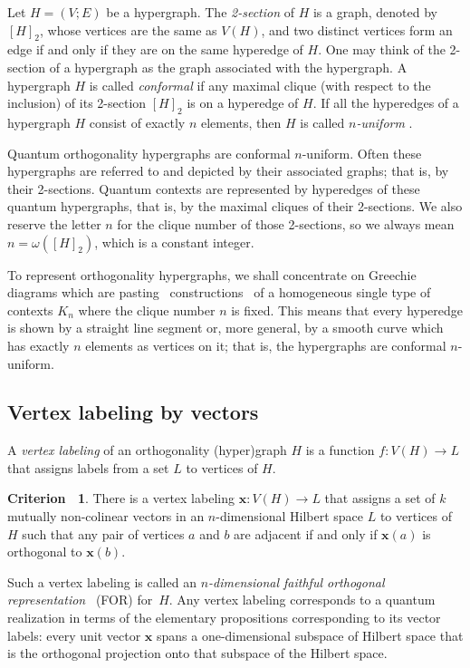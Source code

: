 \documentclass[%
12pt,
prereprint,
showpacs,
showkeys,
preprintnumbers,
amsmath,amssymb,
aps,
pra,
longbibliography,
notitlepage
]{revtex4-1}
\theoremstyle{definition}
\newtheorem{criterion}[theorem]{{\color{THM}Criterion\ }}
\begin{document}
	Let $H = (V;E)$ be a hypergraph. The \emph{2-section}  of $H$ is a graph, denoted by $[H]_2$, whose vertices are the same as $V(H)$, and two distinct vertices form an edge if and only if they are on the same hyperedge of $H$. One may think of the 2-section of a hypergraph as the graph associated with the hypergraph. A hypergraph $H$ is called \emph{conformal} if any maximal clique (with respect to the inclusion) of its 2-section $[H]_2$ is on a hyperedge of $H$. If all the hyperedges of a hypergraph $H$ consist of exactly $n$ elements, then $H$ is called \emph{$n$-uniform} \cite{Bretto-MR3077516}.
	
	
	
	Quantum orthogonality hypergraphs are conformal $n$-uniform. Often these hypergraphs are referred to and depicted by their associated graphs; that is, by their 2-sections. Quantum contexts are represented by hyperedges of these quantum hypergraphs, that is, by the maximal cliques of their 2-sections. We also reserve the letter $n$ for the clique number of those 2-sections, so we always mean $n=\omega ([H]_2 )$, which is a constant integer.
	
	To represent orthogonality hypergraphs, we shall concentrate on Greechie diagrams which are pasting~\cite{Greechie1968} constructions~\cite[Chapter~2]{greechie-66-PhD}
	of a homogeneous  single type
	of contexts $K_n$
	where the clique number $n$ is fixed. This means that every hyperedge is shown by a straight line segment or, more general, by a smooth curve which has exactly $n$ elements as vertices on it; that is, the hypergraphs are conformal $n$-uniform.
	
	\subsection{Vertex labeling by vectors}
	
	A \emph{vertex labeling} of an orthogonality (hyper)graph $H$ is a function $f:V(H)\longrightarrow L$ that assigns labels from a set $L$ to vertices of $H$.
	
	\begin{criterion}\label{orthogonality}
		There is a vertex labeling $\bm{x}:V(H)\longrightarrow L$ that assigns a set of $k$ mutually non-colinear vectors in an $n$-dimensional Hilbert space $L$ to vertices of $H$ such that any pair of vertices $a$ and $b$ are adjacent if and only if $\bm{x}(a)$ is orthogonal to $\bm{x}(b)$.
	\end{criterion}
	
	Such a vertex labeling is called an \emph{$n$-dimensional faithful orthogonal representation}~\cite{lovasz-79,lovasz-89,Portillo-2015} (FOR) for~$H$. Any vertex labeling corresponds to a quantum realization in terms of the elementary propositions corresponding to its vector labels:
	every unit vector $\bm{x}$ spans a one-dimensional subspace of Hilbert space that is the orthogonal projection onto that subspace of the Hilbert space.
	
\end{document}
